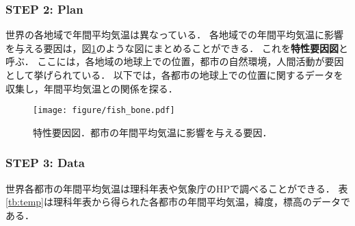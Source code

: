 \subsubsection*{STEP 2: Plan}
%
世界の各地域で年間平均気温は異なっている．
%
各地域での年間平均気温に影響を与える要因は，図\ref{fig:fish_bone}のような図にまとめることができる．
%
これを\textbf{特性要因図}と呼ぶ．
%
ここには，各地域の地球上での位置，都市の自然環境，人間活動が要因として挙げられている．
%
以下では，各都市の地球上での位置に関するデータを収集し，年間平均気温との関係を探る．
%

%
\begin{figure}[H]
	\centering
	\texttt{[image: figure/fish\_bone.pdf]}
	\caption{特性要因図．都市の年間平均気温に影響を与える要因．}
	\label{fig:fish_bone}
\end{figure}
%

\subsubsection*{STEP 3: Data}
%
世界各都市の年間平均気温は理科年表や気象庁のHPで調べることができる．
%
表\ref{tb:temp}は理科年表から得られた各都市の年間平均気温，緯度，標高のデータである．
%

